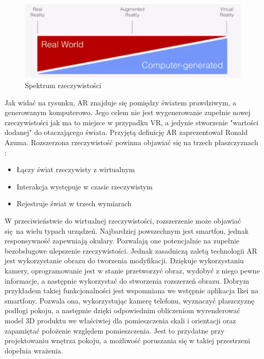 \documentclass[12pt,twoside,polish]{article}
\begin{document}
\begin{figure}
	\centering
	\includegraphics[width=\textwidth]{reality-spectrum}
	\caption{Spektrum rzeczywistości \cite{realityspectrum}}
	\label{realityspectrum}
\end{figure}

Jak widać na rysunku, AR znajduje się pomiędzy światem prawdziwym, a generowanym komputerowo. Jego celem nie jest wygenerowanie zupełnie nowej rzeczywistości jak ma to miejsce w przypadku VR, a jedynie stworzenie "wartości dodanej" do otaczającego świata. Przyjętą definicję AR zaprezentował Ronald Azuma. Rozszerzona rzeczywistość powinna objawiać się na trzech płaszczyznach \cite{azuma}:
\begin{itemize}
	\item Łączy świat rzeczywisty z wirtualnym
	\item Interakcja występuje w czasie rzeczywistym
	\item Rejestruje świat w trzech wymiarach
\end{itemize}

W przeciwieństwie do wirtualnej rzeczywistości, rozszerzenie może objawiać się na wielu typach urządzeń. Najbardziej powszechnym jest smartfon, jednak responsywność zapewniają okulary. Pozwalają one potencjalnie na zupełnie bezobsługowe ulepszenie rzeczywistości. Jednak zasadniczą zaletą technologii AR jest wykorzystanie obrazu do tworzenia modyfikacji. Dziękuje wykorzystaniu kamery, oprogramowanie jest w stanie przetworzyć obraz, wydobyć z niego pewne informacje, a następnie wykorzystać do stworzenia rozszerzeń obrazu. Dobrym przykładem takiej funkcjonalności jest wspomniana we wstępnie aplikacja Ikei na smartfony. Pozwala ona, wykorzystując kamerę telefonu, wyznaczyć płaszczyznę podłogi pokoju, a następnie dzięki odpowiednim obliczeniom wyrenderować model 3D produktu we właściwiej dla pomieszczenia skali i orientacji oraz zapamiętać położenie względem pomieszczenia. Jest to przydatne przy projektowaniu wnętrza pokoju, a możliwość poruszania się w takiej przestrzeni dopełnia wrażenia.
\end{document}
